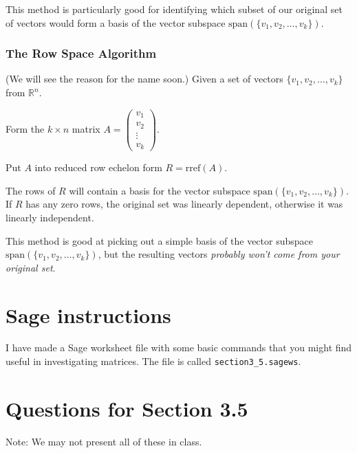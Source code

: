\documentclass[11pt]{amsart}
\theoremstyle{definition}
\begin{document}
This method is particularly good for identifying which subset of our original set of vectors would form a basis of the vector subspace $\mathrm{span}(\{v_1, v_2, \ldots, v_k\})$.


\subsubsection{The Row Space Algorithm}
(We will see the reason for the name soon.)
Given a set of vectors $\{v_1, v_2, \ldots, v_k\}$ from $\mathbb{R}^n$.
\begin{compactenum}
\item Form the $k\times n$ matrix $A = \left( \begin{smallmatrix} v_1 \\ v_2 \\ \vdots \\ v_k\end{smallmatrix}\right)$.
\item Put $A$ into reduced row echelon form $R = \mathrm{rref}(A)$.
\item The rows of $R$ will contain a basis for the vector subspace $\mathrm{span}(\{v_1, v_2, \ldots, v_k\})$. If $R$ has any zero rows, the original set was linearly dependent, otherwise it was linearly independent.
\end{compactenum}

This method is good at picking out a simple basis of the vector subspace $\mathrm{span}(\{v_1, v_2, \ldots, v_k\})$, but the resulting vectors \emph{probably won't come from your original set}.

\section{Sage instructions}

I have made a Sage worksheet file with some basic commands that you might find useful in investigating matrices. The file is called \texttt{section3\_5.sagews}.


\section{Questions for Section 3.5}
\setcounter{exercise}{103}

Note: We may not present all of these in class.
\end{document}
